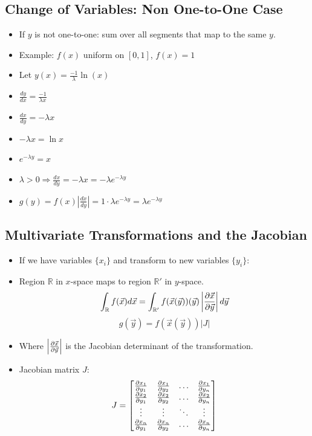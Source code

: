 \subsection{Change of Variables: Non One-to-One Case}
\begin{itemize}
    \item If $y$ is not one-to-one: sum over all segments that map to the same $y$.
    \item Example: $f(x)$ uniform on $[0,1]$, $f(x) = 1$
    \item Let $y(x) = \frac{-1}{\lambda} \ln(x)$
    \item $\frac{dy}{dx} = \frac{-1}{\lambda x}$
    \item $\frac{dx}{dy} = -\lambda x$
    \item $-\lambda x = \ln{x}$
    \item $e^{-\lambda y} = x$
    \item $\lambda > 0 \Rightarrow \frac{dx}{dy} = - \lambda x = -\lambda e^{-\lambda y}$
    \item $ g(y) = f(x) \left| \frac{dx}{dy} \right| = 1 \cdot \lambda e^{-\lambda y} = \lambda e^{-\lambda y}$
\end{itemize}

\subsection{Multivariate Transformations and the Jacobian}
\begin{itemize}
    \item If we have variables $\{x_i\}$ and transform to new variables $\{y_i\}$:
    \item Region $\mathbb{R}$ in $x$-space maps to region $\mathbb{R'}$ in $y$-space.
          \[ \int_{\mathbb{R}} f(\vec{x}) d\vec{x} = \int_{\mathbb{R'}} f(\vec{x}(\vec{y}))(\vec{y}) \left| \pdv{\vec{x}}{\vec{y}} \right| d\vec{y} \]
          \[ g(\vec{y}) = f(\vec{x}(\vec{y})) \left| J \right| \]
    \item Where $\left|\pdv{\vec{x}}{\vec{y}} \right|$ is the Jacobian determinant of the transformation.
    \item Jacobian matrix $J$:
          \[ J = \begin{bmatrix}
                  \pdv{x_1}{y_1} & \pdv{x_1}{y_2} & \ldots & \pdv{x_1}{y_n} \\
                  \pdv{x_2}{y_1} & \pdv{x_2}{y_2} & \ldots & \pdv{x_2}{y_n} \\
                  \vdots         & \vdots         & \ddots & \vdots         \\
                  \pdv{x_n}{y_1} & \pdv{x_n}{y_2} & \ldots & \pdv{x_n}{y_n}
              \end{bmatrix} \]
\end{itemize}

